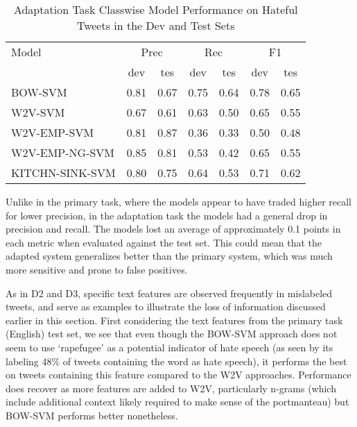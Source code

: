 \documentclass[11pt,a4paper]{article}
\begin{document}
\begin{table}[h]
\centering
\caption{Adaptation Task Classwise Model Performance on Hateful Tweets in the Dev and Test Sets}
\label{tab:prim_class_test}
\tiny
\begin{tabular}{lcccccc}
    \hline
Model
            & \multicolumn{2}{c}{Prec}
                    & \multicolumn{2}{c}{Rec}
                            & \multicolumn{2}{c}{F1}                \\
    &   dev  &   tes  &   dev  &   tes  &   dev  &   tes    \\
    \hline
BOW-SVM    & 0.81  &  0.67  & 0.75 & 0.64 & 0.78  &  0.65   \\
W2V-SVM   & 0.67 & 0.61 & 0.63 & 0.50 & 0.65 & 0.55 \\
W2V-EMP-SVM   &  0.81  & 0.87 &  0.36 & 0.33 &  0.50 & 0.48 \\
W2V-EMP-NG-SVM &  0.85 & 0.81 & 0.53  & 0.42 & 0.65 & 0.55 \\
KITCHN-SINK-SVM & 0.80 & 0.75 & 0.64 & 0.53 & 0.71 &  0.62 \\
    \hline
\end{tabular}
\end{table}



Unlike in the primary task, where the models appear to have traded higher recall for lower precision, in the adaptation task the models had a general drop in precision and recall. The models lost an average of approximately 0.1 points in each metric when evaluated against the test set. This could mean that the adapted system generalizes better than the primary system, which was much more sensitive and prone to false positives.

As in D2 and D3, specific text features are observed frequently in mislabeled tweets, and serve as examples to illustrate the loss of information discussed earlier in this section. First considering the text features from the primary task (English) test set, we see that even though the BOW-SVM approach does not seem to use ‘rapefugee’ as a potential indicator of hate speech (as seen by its labeling 48\% of tweets containing the word as hate speech), it performs the best on tweets containing this feature compared to the W2V approaches. Performance does recover as more features are added to W2V, particularly n-grams (which include additional context likely required to make sense of the portmanteau) but BOW-SVM performs better nonetheless.
\end{document}
